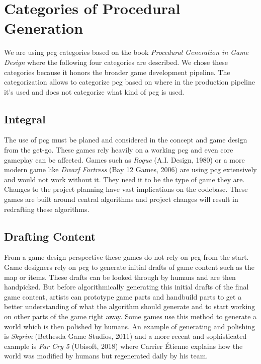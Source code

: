 \documentclass[10pt,a4paper]{article}
\begin{document}
\section{Categories of Procedural Generation}\label{sec:categories}
\begin{multicols}{2}
We are using \gls{pcg} categories based on the book \textit{Procedural Generation in Game Design}\citep[p.~3]{Short:2017:PGG:3161477} where the following four categories are described. We chose these categories because it honors the broader game development pipeline. The categorization allows to categorize \gls{pcg} based on where in the production pipeline it’s used and does not categorize what kind of \gls{pcg} is used.
\end{multicols}
\subsection{Integral}
\begin{multicols}{2} The use of \gls{pcg} must be planed and considered in the concept and game design from the get-go. These games rely heavily on a working \gls{pcg} and even core gameplay can be affected. Games such as \textit{Rogue} (A.I. Design, 1980) or a more modern game like \textit{Dwarf Fortress} (Bay 12 Games, 2006) are using \gls{pcg} extensively and would not work without it. They need it to be the type of game they are. Changes to the project planning have vast implications on the codebase. These games are built around central algorithms and project changes will result in redrafting these algorithms.
\end{multicols}
\subsection{Drafting Content}
\begin{multicols}{2} From a game design perspective these games do not rely on \gls{pcg} from the start. Game designers rely on \gls{pcg} to generate initial drafts of game content such as the map or items. These drafts can be looked through by humans and are then handpicked. But before algorithmically generating this initial drafts of the final game content, artists can prototype game parts and handbuild parts to get a better understanding of what the algorithm should generate and to start working on other parts of the game right away. Some games use this method to generate a world which is then polished by humans. An example of generating and polishing is \textit{Skyrim} (Bethesda Game Studios, 2011) and a more recent and sophisticated example is \textit{Far Cry 5} (Ubisoft, 2018) where Carrier Étienne explains how the world was modified by humans but regenerated daily by his team\cite{Carrier2018}.
\end{multicols}
\end{document}

